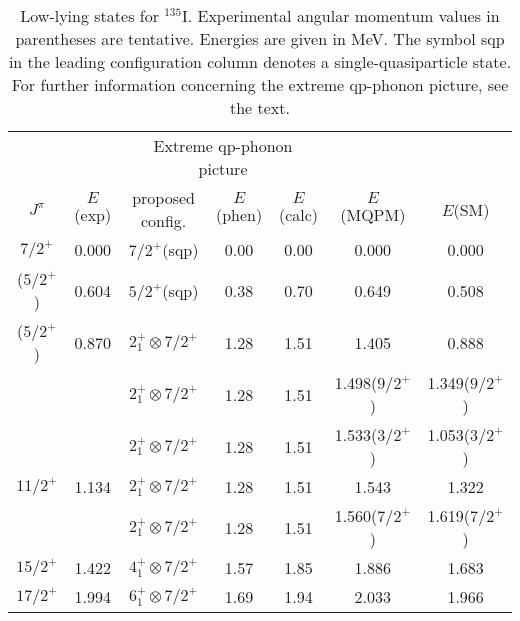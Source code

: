 \begin{table}[htbp]
\begin{center}
\caption{Low-lying states for $^{135}$I. Experimental angular
momentum values in parentheses are tentative. Energies are given in MeV.
The symbol sqp in the leading configuration column denotes a
single-quasiparticle state.
For further information concerning the extreme qp-phonon picture, see the
text.}
\begin{tabular}{cc|cccc|c}
\hline
& & \multicolumn{3}{c}{Extreme qp-phonon picture} & & \\
$J^{\pi}$ & $E$(exp) & proposed config. & $E$(phen) & $E$(calc) 
& $E$(MQPM) & $E$(SM) \\ 
\hline
$7/2^{+}$ & 0.000 & $7/2^+$(sqp) & 0.00 & 0.00 & 0.000 & 0.000 \\
($5/2^{+}$) & 0.604 & $5/2^+$(sqp) & 0.38 & 0.70 & 0.649 & 0.508 \\
($5/2^{+}$) & 0.870 & $2^+_1\otimes 7/2^+$ & 1.28 & 1.51 & 1.405 & 0.888 \\
& & $2^+_1\otimes 7/2^+$ & 1.28 & 1.51 & 1.498($9/2^+$) & 1.349($9/2^+$) \\
& & $2^+_1\otimes 7/2^+$ & 1.28 & 1.51 & 1.533($3/2^+$) & 1.053($3/2^+$) \\
$11/2^{+}$ & 1.134 & $2^+_1\otimes 7/2^+$ & 1.28 & 1.51 & 1.543 & 1.322 \\
& & $2^+_1\otimes 7/2^+$ & 1.28 & 1.51 & 1.560($7/2^+$) & 1.619($7/2^+$) \\
$15/2^{+}$ & 1.422 & $4^+_1\otimes 7/2^+$ & 1.57 & 1.85 & 1.886 & 1.683 \\
$17/2^{+}$ & 1.994 & $6^+_1\otimes 7/2^+$ & 1.69 & 1.94 & 2.033 & 1.966 \\
\hline
\end{tabular}
\label{tab:odd-2}
\end{center}
\end{table}
